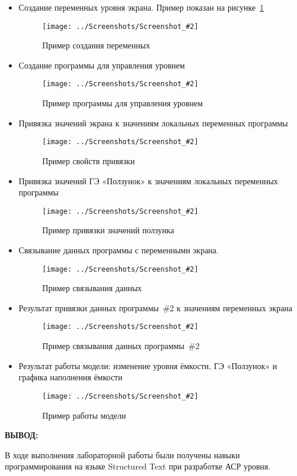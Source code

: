 \documentclass[14pt,a4paper]{extreport}
\newcommand{\sshot}[2]{\begin{figure}[ht]%
\centering\texttt{[image: ../Screenshots/Screenshot\_\#2]}%
\caption{#1}%
\label{sshot#2}%
\end{figure}%
}
\newcommand{\header}[1]{%
{
\clearpage%
\fontsize{16pt}{14pt}\selectfont
\begin{center}
\textbf{\MakeUppercase{#1}:}
\end{center}
}
}
\begin{document}
\begin{itemize}

\item Создание переменных уровня экрана. Пример показан на рисунке~\ref{sshot1}

\sshot{Пример создания переменных}{1}

\item Создание программы для управления уровнем

\sshot{Пример программы для управления уровнем}{2}

\item Привязка значений экрана к значениям локальных переменных программы

\sshot{Пример свойств привязки}{3}

\clearpage

\item Привязка значений ГЭ «Ползунок» к значениям локальных переменных программы

\sshot{Пример привязки значений ползунка}{4}

\item Связывание данных программы с переменными экрана.

\sshot{Пример связывания данных}{5}

\item Результат привязки данных программы~\#2 к значениям переменных экрана

\sshot{Пример связывания данных программы~\#2}{6}

\item Результат работы модели: изменение уровня ёмкости, ГЭ «Ползунок» и графика наполнения ёмкости

\sshot{Пример работы модели}{7}

\end{itemize}

\header{Вывод}


В ходе выполнения лабораторной работы были получены навыки программирования на языке Structured Text при разработке АСР уровня.
\end{document}
